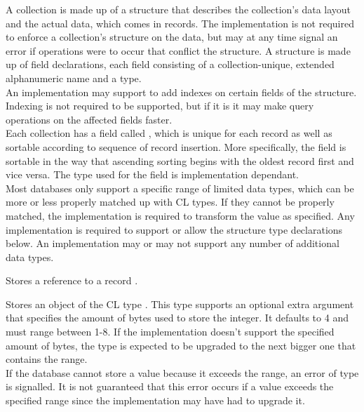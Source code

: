 A collection is made up of a structure that describes the collection's data layout and the actual data, which comes in records. The implementation is not required to enforce a collection's structure on the data, but may at any time signal an error if operations were to occur that conflict the structure. A structure is made up of field declarations, each field consisting of a collection-unique, extended alphanumeric name and a type.\\

An implementation may support to add indexes on certain fields of the structure. Indexing is not required to be supported, but if it is it may make query operations on the affected fields faster. \\

Each collection has a field called , which is unique for each record as well as sortable according to sequence of record insertion. More specifically, the  field is sortable in the way that ascending sorting begins with the oldest record first and vice versa. The type used for the field is implementation dependant. \\

Most databases only support a specific range of limited data types, which can be more or less properly matched up with CL types. If they cannot be properly matched, the implementation is required to transform the value as specified. Any implementation is required to support or allow the structure type declarations below. An implementation may or may not support any number of additional data types. 

Stores a reference to a record .

Stores an object of the CL type . This type supports an optional extra argument that specifies the amount of bytes used to store the integer. It defaults to 4 and must range between 1-8. If the implementation doesn't support the specified amount of bytes, the type is expected to be upgraded to the next bigger one that contains the range. \\

\noindent If the database cannot store a value because it exceeds the range, an error of type  is signalled. It is not guaranteed that this error occurs if a value exceeds the specified range since the implementation may have had to upgrade it.

